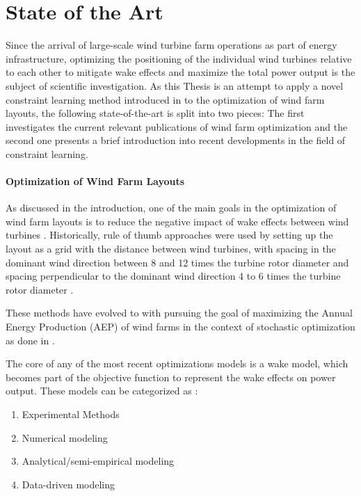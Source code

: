 
\chapter{State of the Art}\label{chapter:state_of_the_art}

Since the arrival of large-scale wind turbine farm operations as part of energy infrastructure, optimizing the positioning of the individual wind turbines relative to each other to mitigate wake effects and maximize the total power output is the subject of scientific investigation. As this Thesis is an attempt to apply a novel constraint learning method introduced in \cite{ALCANTARA2023120895} to the optimization of wind farm layouts, the following state-of-the-art is split into two pieces:  The first investigates the current relevant publications of wind farm optimization and the second one presents a brief introduction into recent developments in the field of constraint learning. 

\subsubsection{Optimization of Wind Farm Layouts}

As discussed in the introduction, one of the main goals in the optimization of wind farm layouts is to reduce the negative impact of wake effects between wind turbines \cite{KIM2024123383}. Historically, rule of thumb approaches were used by setting up the layout as a grid  with the distance between wind turbines, with spacing in the dominant wind direction between 8 and 12 times the turbine rotor diameter and spacing perpendicular to the dominant wind direction 4 to 6 times the turbine rotor diameter \cite{AZLAN2021110047} \cite{hou_review_2019}.

These methods have evolved to with pursuing the goal of maximizing the Annual Energy Production (AEP) of wind farms in the context of stochastic optimization as done in \cite{Sinner_2024} \cite{KIM2024123383}. 

The core of any of the most recent optimizations models is a wake model, which becomes part of the objective function to represent the wake effects on power output. These models can be categorized as \cite{WANG2024118508}: 

\begin{enumerate}
	\item Experimental Methods
	\item Numerical modeling
	\item Analytical/semi-empirical modeling
	\item Data-driven modeling
\end{enumerate}

